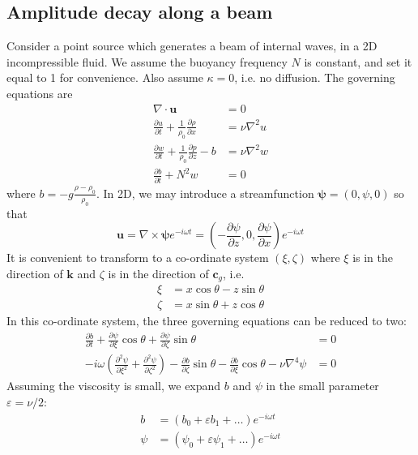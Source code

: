 \documentclass{jknotes}
\begin{document}
\subsection{Amplitude decay along a beam}
Consider a point source which generates a beam of internal waves, in a 2D
incompressible fluid. We assume the buoyancy frequency $N$ is constant, and
set it equal to 1 for convenience. Also assume $\kappa = 0$, i.e. no
diffusion. The governing equations are
\begin{align}
	\nabla \cdot \symbf{u} &= 0 \\
	\frac{\partial u}{\partial t} + \frac{1}{\rho_0} \frac{\partial
\rho}{\partial x} &= \nu \nabla^2 u \\
\frac{\partial w}{\partial t} + \frac{1}{\rho_0} \frac{\partial p}{\partial z}
- b &= \nu \nabla^2 w \\
\frac{\partial b}{\partial t} + N^2 w &= 0 
\end{align}
where $b = - g \frac{\rho-\rho_0}{\rho_0}$. In 2D, we may introduce a
streamfunction $\symbf{\psi} = (0,\psi,0)$ so that
\begin{equation}
	\symbf{u} = \nabla \times \symbf{\psi} e^{-i\omega t} = (-\frac{\partial
	\psi}{\partial z}, 0, \frac{\partial \psi}{\partial x}) e^{-i\omega t}
\end{equation}
It is convenient to transform to a co-ordinate system $(\xi, \zeta)$ where
$\xi$ is in the direction of $\symbf{k}$ and $\zeta$ is in the direction of
$\symbf{c}_g$, i.e.
\begin{align}
	\xi &= x \cos \theta - z \sin \theta \\
	\zeta &= x \sin \theta + z \cos \theta 
\end{align}
In this co-ordinate system, the three governing equations can be reduced to two:
\begin{align}
	\frac{\partial b}{\partial t} + \frac{\partial \psi}{\partial \xi} \cos
	\theta + \frac{\partial \psi}{\partial \zeta} \sin \theta &= 0 \\
	-i\omega \left( \frac{\partial^2 \psi}{\partial \xi^2} + \frac{\partial^2
	\psi}{\partial \zeta^2}\right) - \frac{\partial b}{\partial \zeta} \sin
	\theta - \frac{\partial b}{\partial \xi} \cos \theta - \nu \nabla^4 \psi
															  &= 0 
\end{align}
Assuming the viscosity is small, we expand $b$ and $\psi$ in the small
parameter $\varepsilon = \nu/2$:
\begin{align}
	b &= (b_0 + \varepsilon b_1 + \dots) e^{-i\omega t} \\
	\psi &= (\psi_0 + \varepsilon \psi_1 + \dots )e^{-i\omega t}
\end{align}
\end{document}
